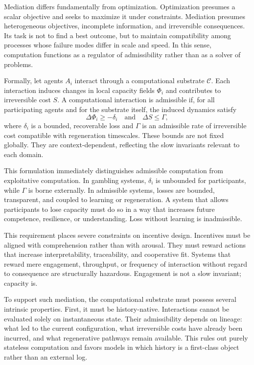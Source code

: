 \documentclass[12pt,oneside]{book}
\begin{document}
Mediation differs fundamentally from optimization. Optimization presumes a scalar objective and seeks to maximize it under constraints. Mediation presumes heterogeneous objectives, incomplete information, and irreversible consequences. Its task is not to find a best outcome, but to maintain compatibility among processes whose failure modes differ in scale and speed. In this sense, computation functions as a regulator of admissibility rather than as a solver of problems.

Formally, let agents \(A_i\) interact through a computational substrate \(\mathcal{C}\). Each interaction induces changes in local capacity fields \(\Phi_i\) and contributes to irreversible cost \(S\). A computational interaction is admissible if, for all participating agents and for the substrate itself, the induced dynamics satisfy
\[
\Delta \Phi_i \geq -\delta_i \quad \text{and} \quad \Delta S \leq \Gamma,
\]
where \(\delta_i\) is a bounded, recoverable loss and \(\Gamma\) is an admissible rate of irreversible cost compatible with regeneration timescales. These bounds are not fixed globally. They are context-dependent, reflecting the slow invariants relevant to each domain.

This formulation immediately distinguishes admissible computation from exploitative computation. In gambling systems, \(\delta_i\) is unbounded for participants, while \(\Gamma\) is borne externally. In admissible systems, losses are bounded, transparent, and coupled to learning or regeneration. A system that allows participants to lose capacity must do so in a way that increases future competence, resilience, or understanding. Loss without learning is inadmissible.

This requirement places severe constraints on incentive design. Incentives must be aligned with comprehension rather than with arousal. They must reward actions that increase interpretability, traceability, and cooperative fit. Systems that reward mere engagement, throughput, or frequency of interaction without regard to consequence are structurally hazardous. Engagement is not a slow invariant; capacity is.

To support such mediation, the computational substrate must possess several intrinsic properties. First, it must be history-native. Interactions cannot be evaluated solely on instantaneous state. Their admissibility depends on lineage: what led to the current configuration, what irreversible costs have already been incurred, and what regenerative pathways remain available. This rules out purely stateless computation and favors models in which history is a first-class object rather than an external log.
\end{document}
